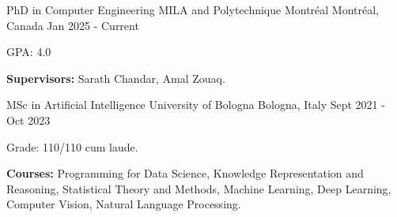 

\begin{cventries}

 
 \begin{comment}
 \cventry
    {PhD in Computer Engineering} %
    {MILA and Polytechnique Montreal} %
    {Montreal, Canada} %
    {Aug 2024 - Present} %
    {
      \begin{cvitems} %
        \item {\textbf{Supervised by:} Sarath Chandar and Anbil Parthipan.}
      \end{cvitems}
    }
    \end{comment}
 
    \cventry
    {PhD in Computer Engineering} %
    {MILA and Polytechnique Montréal} %
    {Montréal, Canada} %
    {Jan 2025 - Current} %
    {
      \begin{cvitems} %
        \item  {GPA: 4.0}
        \item {\textbf{Supervisors:} Sarath Chandar, Amal Zouaq.}
      \end{cvitems}
    }
    
    \cventry
    {MSc in Artificial Intelligence} %
    {University of Bologna} %
    {Bologna, Italy} %
    {Sept 2021 - Oct 2023} %
    {
      \begin{cvitems} %
        \item  {Grade: 110/110 cum laude.}
        \item {\textbf{Courses:} Programming for Data Science, Knowledge Representation and Reasoning, Statistical Theory and Methods, Machine Learning, Deep Learning, Computer Vision, Natural Language Processing.}
      \end{cvitems}
    }
    

\end{cventries}
